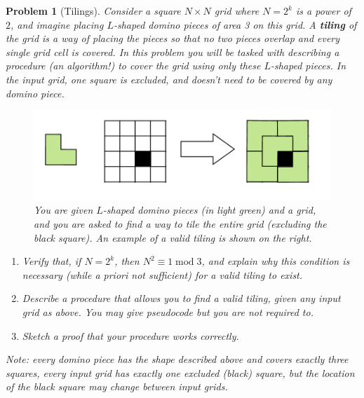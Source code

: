 \documentclass[10pt]{article}
\newtheorem{problem}{\sc\color{cit}Problem}
\begin{document}
\newpage
\begin{problem}[Tilings] 
Consider a square $N \times N$ grid where $N = 2^k$ is a power of $2$, and imagine placing $L$-shaped domino pieces of area 3 on this grid. A \textbf{tiling} of the grid is a way of placing the pieces so that no two pieces overlap and every single grid cell is covered. In this problem you will be tasked with describing a procedure (an algorithm!) to cover the grid using only these $L$-shaped pieces. In the input grid, one square is excluded, and doesn't need to be covered by any domino piece.
\begin{figure}[H]
    \centering
    \includegraphics[scale=0.7]{diagrams/tiling.png}
    \caption{You are given $L$-shaped domino pieces (in light green) and a grid, and you are asked to find a way to tile the entire grid (excluding the black square). An example of a valid tiling is shown on the right.}
    \label{fig:my_label}
\end{figure}
\noindent 
\begin{enumerate}
    \item[(a)] Verify that, if $N = 2^k$, then $N^2 \equiv 1 \operatorname{ mod } 3$, and explain why this condition is necessary (while a priori not sufficient) for a valid tiling to exist.
    \item[(b)] Describe a procedure that allows you to find a valid tiling, given any input grid as above. You may give pseudocode but you are not required to.
    \item[(c)] Sketch a proof that your procedure works correctly.
\end{enumerate}
Note: every domino piece has the shape described above and covers exactly three squares, every input grid has exactly one excluded (black) square, but the location of the black square may change between input grids.
\end{problem}
\end{document}

